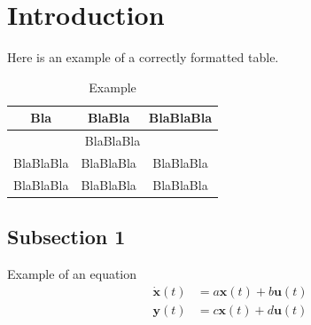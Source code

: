 \documentclass[a4paper, 11pt]{article} %
\makeatletter
\let\oldabstract\abstract
\let\oldendabstract\endabstract
\renewenvironment{abstract}
{\renewenvironment{quotation}%
               {\list{}{\addtolength{\leftmargin}{-9mm} %
                        \listparindent 0em%
                        \itemindent    \listparindent%
                        \rightmargin   \leftmargin%
                        \parsep        \z@ \@plus\p@}%
                \item\relax}%
               {\endlist}%
\oldabstract}
{\oldendabstract}
\makeatother
\begin{document}
\thispagestyle{plain} 
\begin{abstract}
\justify

\lipsum[1] %


\end{abstract}


\newpage %

\tableofcontents

\listoffigures

\listoftables

\printnomenclature

\pagebreak


\section{Introduction}
\lipsum[1] %

Here is an example of a correctly formatted table.
\begin{table}[H]
	\center
	\caption{Example}
	\vspace{0.2cm}
	{\renewcommand{\arraystretch}{1.5}%
		\begin{tabular}{|c|c|c|}
			\hline
			\textbf{Bla} & \textbf{BlaBla} & \textbf{BlaBlaBla} \\
			\hline 
			\hline
			\multicolumn{3}{|c|}{BlaBlaBla} \\
			\hline
			BlaBlaBla & BlaBlaBla & BlaBlaBla \\
			\hline 
			BlaBlaBla & BlaBlaBla & BlaBlaBla \\
			\hline
		\end{tabular}
	}
\end{table}

\subsection{Subsection 1}
\lipsum[1] %

Example of an equation
\begin{equation}
\begin{split}
\dot{\textbf{x}}(t)& = a\textbf{x}(t) + b\textbf{u}(t) \\
\textbf{y}(t) &= c\textbf{x}(t) + d\textbf{u}(t)
\end{split}
\end{equation}
\end{document}
